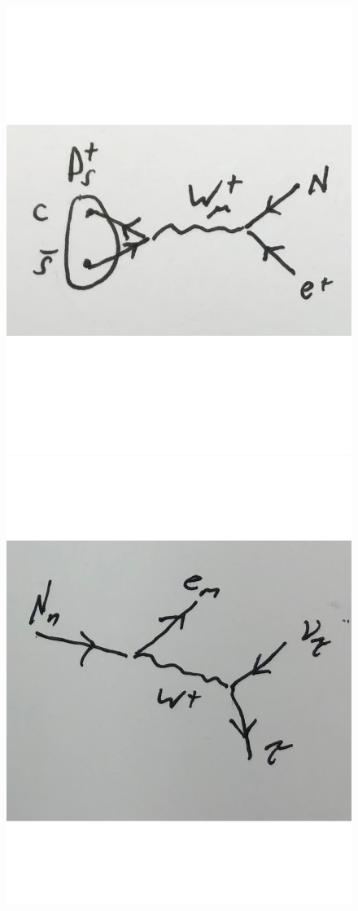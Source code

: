 \documentclass[
	11pt, %
]{beamer}
\begin{document}
\begin{frame}
\begin{figure}
	\includegraphics[scale=.18]{meson_decay.pdf}
	\includegraphics[scale=.18]{Ndecay.pdf}

\end{figure}
\end{frame}
\end{document}
